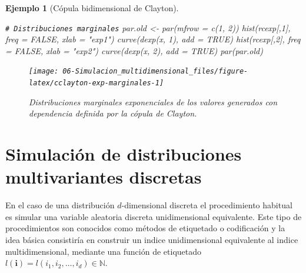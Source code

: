\documentclass[
  10pt,
]{book}
\newenvironment{Shaded}{\begin{snugshade}}{\end{snugshade}}
\newcommand{\AttributeTok}[1]{\textcolor[rgb]{0.77,0.63,0.00}{#1}}
\newcommand{\CommentTok}[1]{\textcolor[rgb]{0.56,0.35,0.01}{\textit{#1}}}
\newcommand{\ConstantTok}[1]{\textcolor[rgb]{0.00,0.00,0.00}{#1}}
\newcommand{\DecValTok}[1]{\textcolor[rgb]{0.00,0.00,0.81}{#1}}
\newcommand{\FunctionTok}[1]{\textcolor[rgb]{0.00,0.00,0.00}{#1}}
\newcommand{\NormalTok}[1]{#1}
\newcommand{\OtherTok}[1]{\textcolor[rgb]{0.56,0.35,0.01}{#1}}
\newcommand{\StringTok}[1]{\textcolor[rgb]{0.31,0.60,0.02}{#1}}
\renewcommand{\mathbf}[1]{\symbf{#1}}
\theoremstyle{break}
\newtheorem{example}{Ejemplo}[chapter]
\theoremstyle{nonumberplain}
\renewcommand{\CommentTok}[1]{\textcolor[rgb]{0.41,0.41,0.41}{\texttt{#1}}}
\begin{document}
\begin{example}[Cópula bidimensional de Clayton]
\begin{Shaded}
\begin{Highlighting}[]
\CommentTok{\# Distribuciones marginales}
\NormalTok{par.old }\OtherTok{\textless{}{-}} \FunctionTok{par}\NormalTok{(}\AttributeTok{mfrow =} \FunctionTok{c}\NormalTok{(}\DecValTok{1}\NormalTok{, }\DecValTok{2}\NormalTok{))}
\FunctionTok{hist}\NormalTok{(rcexp[,}\DecValTok{1}\NormalTok{], }\AttributeTok{freq =} \ConstantTok{FALSE}\NormalTok{, }\AttributeTok{xlab =} \StringTok{"exp1"}\NormalTok{)}
\FunctionTok{curve}\NormalTok{(}\FunctionTok{dexp}\NormalTok{(x, }\DecValTok{1}\NormalTok{), }\AttributeTok{add =} \ConstantTok{TRUE}\NormalTok{)}
\FunctionTok{hist}\NormalTok{(rcexp[,}\DecValTok{2}\NormalTok{], }\AttributeTok{freq =} \ConstantTok{FALSE}\NormalTok{, }\AttributeTok{xlab =} \StringTok{"exp2"}\NormalTok{)}
\FunctionTok{curve}\NormalTok{(}\FunctionTok{dexp}\NormalTok{(x, }\DecValTok{2}\NormalTok{), }\AttributeTok{add =} \ConstantTok{TRUE}\NormalTok{)}
\FunctionTok{par}\NormalTok{(par.old)}
\end{Highlighting}
\end{Shaded}

\begin{figure}[!htbp]

{\centering \texttt{[image: 06-Simulacion\_multidimensional\_files/figure-latex/cclayton-exp-marginales-1]} 

}

\caption{Distribuciones marginales exponenciales de los valores generados con dependencia definida por la cópula de Clayton.}\label{fig:cclayton-exp-marginales}
\end{figure}

\end{example}

\hypertarget{mult-discr}{%
\section{Simulación de distribuciones multivariantes discretas}\label{mult-discr}}

En el caso de una distribución \(d\)-dimensional discreta el procedimiento habitual es simular una variable aleatoria discreta unidimensional equivalente.
Este tipo de procedimientos son conocidos como métodos de etiquetado o codificación y la idea básica consistiría en construir un indice unidimensional equivalente al indice multidimensional, mediante una función de etiquetado
\(l(\mathbf{i}) = l\left(i_1, i_2, \ldots,i_d \right) \in \mathbb{N}\).
\end{document}
